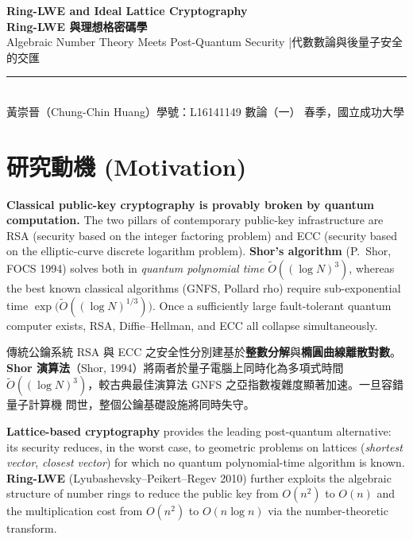 \documentclass[12pt, a4paper]{article}
\begin{document}
\begin{center}
  {\LARGE\bfseries\color{accent}
    Ring-LWE and Ideal Lattice Cryptography}\\[4pt]
  {\large\bfseries Ring-LWE 與理想格密碼學}\\[2pt]
  {\normalsize Algebraic Number Theory Meets Post-Quantum Security
    \quad|\quad 代數數論與後量子安全的交匯}\\[8pt]
  \rule{\linewidth}{0.8pt}\\[4pt]
  {\small 黃崇晉（Chung-Chin Huang）\quad 學號：L16141149
    \quad 數論（一） 春季，國立成功大學}
\end{center}

\vspace{4pt}

\section{研究動機 \small\normalfont\color{gray}(Motivation)}

\textbf{Classical public-key cryptography is provably broken by quantum computation.}
The two pillars of contemporary public-key infrastructure are RSA (security based on the
integer factoring problem) and ECC (security based on the elliptic-curve discrete logarithm
problem). \textbf{Shor's algorithm} (P.\ Shor, FOCS 1994) solves both in
\textit{quantum polynomial time} $\widetilde{O}((\log N)^3)$, whereas the best known classical
algorithms (GNFS, Pollard rho) require sub-exponential time
$\exp\!\bigl(\widetilde{O}((\log N)^{1/3})\bigr)$. Once a sufficiently large fault-tolerant
quantum computer exists, RSA, Diffie--Hellman, and ECC all collapse simultaneously.

傳統公鑰系統 RSA 與 ECC 之安全性分別建基於\textbf{整數分解}與\textbf{橢圓曲線離散對數}。
\textbf{Shor 演算法}（Shor, 1994）將兩者於量子電腦上同時化為多項式時間
$\widetilde{O}((\log N)^3)$，較古典最佳演算法 GNFS 之亞指數複雜度顯著加速。一旦容錯量子計算機
問世，整個公鑰基礎設施將同時失守。

\textbf{Lattice-based cryptography} provides the leading post-quantum alternative: its security
reduces, in the worst case, to geometric problems on lattices (\textit{shortest vector},
\textit{closest vector}) for which no quantum polynomial-time algorithm is known.
\textbf{Ring-LWE} (Lyubashevsky--Peikert--Regev 2010) further exploits the algebraic
structure of number rings to reduce the public key from $O(n^2)$ to $O(n)$ and the
multiplication cost from $O(n^2)$ to $O(n\log n)$ via the number-theoretic transform.
\end{document}
